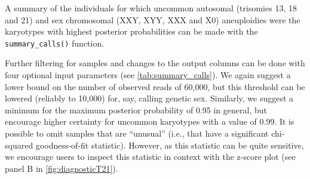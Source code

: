 \documentclass[
  letterpaper,
  DIV=11,
  numbers=noendperiod]{scrartcl}
\begin{document}
A summary of the individuals for which uncommon autosomal (trisomies 13,
18 and 21) and sex chromosomal (XXY, XYY, XXX and X0) aneuploidies were
the karyotypes with highest posterior probabilities can be made with the
\texttt{summary\_calls()} function.

Further filtering for samples and changes to the output columns can be
done with four optional input parameters (see
\autoref{tab:summary_calls}). We again suggest a lower bound on the
number of observed reads of 60,000, but this threshold can be lowered
(reliably to 10,000) for, say, calling genetic sex. Similarly, we
suggest a minimum for the maximum posterior probability of 0.95 in
general, but encourage higher certainty for uncommon karyotypes with a
value of 0.99. It is possible to omit samples that are ``unusual''
(i.e., that have a significant chi-squared goodness-of-fit statistic).
However, as this statistic can be quite sensitive, we encourage users to
inspect this statistic in context with the z-score plot (see panel B in
\autoref{fig:diagnosticT21}).
\end{document}

